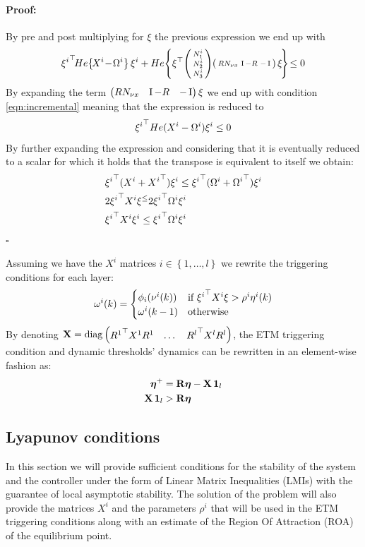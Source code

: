 \documentclass{ifacconf}
\theoremstyle{plain}
\newenvironment{proof}{\paragraph*{Proof:}}{\hfill$\square$}
\begin{document}
\begin{proof} By pre and post multiplying for $\xi$ the previous expression we end up with
$$
    {\xi^i}\tr\! He \!\left\{\!X^i \!-\! \Omega^i\right\} \xi^i + He\!\left\{ \xi\tr\! \smallpmat{N^i_1\\ N^i_2\\ N^i_3}\! \smallpmat{R N_{\nu x} & \Id - R & -\Id} \xi\! \right\}\! \leq 0
$$
By expanding the term $\left(\begin{matrix}R N_{\nu x} & \operatorname{I} - R & -\operatorname{I}\end{matrix}\right) \xi$ we end up with condition \eqref{eqn:incremental} meaning that the expression is reduced to
$$
    {\xi^i}^\top He(X^i - \Omega^i) \xi^i \leq 0
$$
By further expanding the expression and considering that it is eventually reduced to a scalar for which it holds that the transpose is equivalent to itself we obtain:  
\begin{equation*}
\begin{aligned}
    &{\xi^i}^\top (X^i + {X^i}^\top) \xi^i \leq {\xi^i}^\top (\Omega^i + {\Omega^i}^\top) \xi^i\\
    &2 {\xi^i}^\top X^i\xi^ \leq 2 {\xi^i}^\top \Omega^i \xi^i\\
    & {\xi^i}^\top X^i \xi^i \leq {\xi^i}^\top \Omega^i \xi^i
\end{aligned}
\end{equation*}
\end{proof}

Assuming we have the $X^i$ matrices $i \in \left\{1, \dots, l \right\}$ we rewrite the triggering conditions for each layer:
\begin{equation}
  \omega^{i}(k) = \begin{cases}
    \phi_i(\nu^i(k)) & \text{if } {\xi^i}^\top X^i \xi > \rho^i \eta^i(k)\\
    \omega^{i}(k-1) & \text{otherwise}
  \end{cases}
\end{equation}
By denoting ${\bf{X}} = \text{diag} \left(\begin{matrix}{R^1}^\top X^1 R^1 & \dots & {R^l}^\top X^l R^l\end{matrix}\right)$, the ETM triggering condition and dynamic thresholds' dynamics can be rewritten in an element-wise fashion as:
\begin{equation}
\begin{aligned}
    \boldsymbol{\eta}^+ &= {\bf{R}} \boldsymbol{\eta} - {\bf{X}} \operatorname{\mathbf{1}}_l\\
    {\bf{X}} \operatorname{\mathbf{1}}_l&> {\bf{R}} \boldsymbol{\eta}\end{aligned}
\end{equation}

\subsection{Lyapunov conditions}
In this section we will provide sufficient conditions for the stability of the system and the controller under the form of Linear Matrix Inequalities (LMIs) with the guarantee of local asymptotic stability. The solution of the problem will also provide the matrices $X^i$ and the parameters $\rho^i$ that will be used in the ETM triggering conditions along with an estimate of the Region Of Attraction (ROA) of the equilibrium point. 
\end{document}
